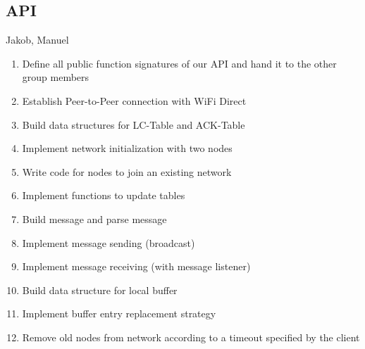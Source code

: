 	
		\subsection{API}
			Jakob, Manuel

\begin{enumerate}

\item Define all public function signatures of our API and hand it to the other group members
\item Establish Peer-to-Peer connection with WiFi Direct
\item Build data structures for LC-Table and ACK-Table
\item Implement network initialization with two nodes
\item Write code for nodes to join an existing network

\item Implement functions to update tables
\item Build message and parse message
\item Implement message sending (broadcast)


\item Implement message receiving (with message listener)
\item Build data structure for local buffer
\item Implement buffer entry replacement strategy
\item Remove old nodes from network according to a timeout specified by the client
\end{enumerate}


